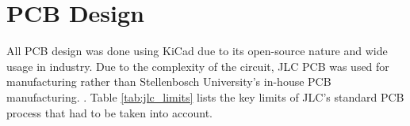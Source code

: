 \section{PCB Design}\label{sec:PCB}

All PCB design was done using KiCad due to its open-source nature and wide usage in industry. Due to the complexity of the circuit, JLC PCB was used for manufacturing rather than Stellenbosch University's in-house PCB manufacturing. . Table \ref{tab:jlc_limits} lists the key limits of JLC's standard PCB process that had to be taken into account. 

